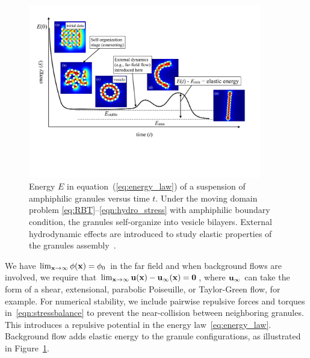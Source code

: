 \begin{figure} 
  \vspace{-10pt}
  \includegraphics[width=4in]{figures/Background/coarsening.pdf}
  \vspace{-25pt}
  \caption{\label{fig:coarsening} \footnotesize Energy $E$ in
  equation~(\ref{eq:energy_law}) of a suspension of amphiphilic granules
  versus time $t$. Under the moving domain problem
  \eqref{eq:RBT}--\eqref{eqn:hydro_stress} with amphiphilic boundary
  condition, the granules self-organize into vesicle bilayers. External
  hydrodynamic effects are introduced to study elastic properties of
  the granules assembly~\cite{Fu2018_SIAM,FuQuRyYo22}.}
\end{figure}

We have $\lim_{\mathbf{x} \to \infty} \phi(\mathbf{x}) = \phi_0$ in the far field and
when background flows are involved, we require that $\lim_{\mathbf{x} \to
\infty} \mathbf{u}(\mathbf{x}) - \mathbf{u}_{\infty}(\mathbf{x}) = \mathbf{0}$, where $\mathbf{u}_{\infty}$
can take the form
of a shear, extensional, parabolic Poiseuille, or Taylor-Green flow, for
example. For numerical stability, we include pairwise repulsive forces
and torques in~\eqref{eqn:stressbalance} to prevent the near-collision
between neighboring granules. This introduces a repulsive potential in
the energy law~\eqref{eq:energy_law}. Background flow adds elastic
energy to the granule configurations, as illustrated in
Figure~\ref{fig:coarsening}.


